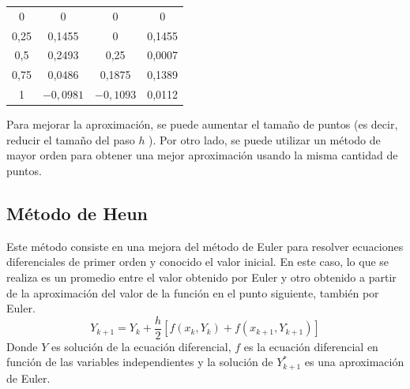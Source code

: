 \begin{questions}
\begin{table}[ht!]
\begin{tabular}{|c|c|c|c|}
            \hline 0  & 0             & 0                & 0      \\
            0,25      & 0,1455        & 0                & 0,1455 \\
            0,5       & 0,2493        & 0,25             & 0,0007 \\
            0,75      & 0,0486        & 0,1875           & 0,1389 \\
            1         & $-0,0981$     & $-0,1093$        & 0,0112 \\
            \hline
        \end{tabular}
    \end{table}
    Para mejorar la aproximación, se puede aumentar el tamaño de puntos (es decir, reducir el tamaño del paso $h$ ).
    Por otro lado, se puede utilizar un método de mayor orden para obtener una mejor aproximación usando la misma cantidad de puntos.
\end{questions}

\subsection{Método de Heun}

Este método consiste en una mejora del método de Euler para resolver ecuaciones
diferenciales de primer orden y conocido el valor inicial.
En este caso, lo que se realiza es un promedio entre el valor obtenido por
Euler y otro obtenido a partir de la aproximación del valor de la función en el punto siguiente, también por Euler.
\begin{equation*}
    Y_{k+1}=Y_k+\frac{h}{2}\left[f\left(x_k, Y_k\right)+f\left(x_{k+1}, Y_{k+1}^{\cdot}\right)\right]
\end{equation*}
Donde $Y$ es solución de la ecuación diferencial, $f$ es la ecuación diferencial en función de las
variables independientes y la solución de $Y_{k+1}^*$ es una aproximación de Euler.

